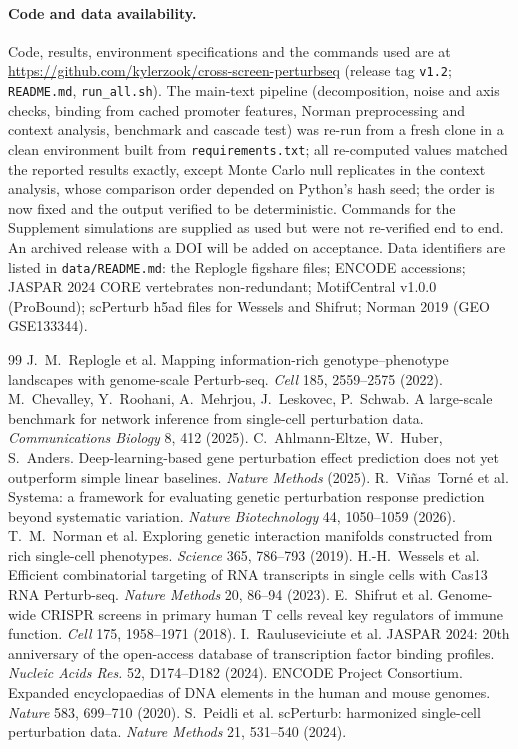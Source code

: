 \documentclass[10pt]{article}
\begin{document}
\paragraph{Code and data availability.} Code, results, environment specifications and the commands used are at \url{https://github.com/kylerzook/cross-screen-perturbseq} (release tag \texttt{v1.2}; \texttt{README.md}, \texttt{run\_all.sh}). The main-text pipeline (decomposition, noise and axis checks, binding from cached promoter features, Norman preprocessing and context analysis, benchmark and cascade test) was re-run from a fresh clone in a clean environment built from \texttt{requirements.txt}; all re-computed values matched the reported results exactly, except Monte Carlo null replicates in the context analysis, whose comparison order depended on Python's hash seed; the order is now fixed and the output verified to be deterministic. Commands for the Supplement simulations are supplied as used but were not re-verified end to end. An archived release with a DOI will be added on acceptance. Data identifiers are listed in \texttt{data/README.md}: the Replogle figshare files; ENCODE accessions; JASPAR 2024 CORE vertebrates non-redundant; MotifCentral v1.0.0 (ProBound); scPerturb h5ad files for Wessels and Shifrut; Norman 2019 (GEO GSE133344).

\begin{thebibliography}{99}\small
{} J.~M.~Replogle et al. Mapping information-rich genotype--phenotype landscapes with genome-scale Perturb-seq. \emph{Cell} 185, 2559--2575 (2022).
 M.~Chevalley, Y.~Roohani, A.~Mehrjou, J.~Leskovec, P.~Schwab. A large-scale benchmark for network inference from single-cell perturbation data. \emph{Communications Biology} 8, 412 (2025).
 C.~Ahlmann-Eltze, W.~Huber, S.~Anders. Deep-learning-based gene perturbation effect prediction does not yet outperform simple linear baselines. \emph{Nature Methods} (2025).
 R.~Vi\~nas~Torn\'e et al. Systema: a framework for evaluating genetic perturbation response prediction beyond systematic variation. \emph{Nature Biotechnology} 44, 1050--1059 (2026).
 T.~M.~Norman et al. Exploring genetic interaction manifolds constructed from rich single-cell phenotypes. \emph{Science} 365, 786--793 (2019).
 H.-H.~Wessels et al. Efficient combinatorial targeting of RNA transcripts in single cells with Cas13 RNA Perturb-seq. \emph{Nature Methods} 20, 86--94 (2023).
 E.~Shifrut et al. Genome-wide CRISPR screens in primary human T cells reveal key regulators of immune function. \emph{Cell} 175, 1958--1971 (2018).
 I.~Rauluseviciute et al. JASPAR 2024: 20th anniversary of the open-access database of transcription factor binding profiles. \emph{Nucleic Acids Res.} 52, D174--D182 (2024).
 ENCODE Project Consortium. Expanded encyclopaedias of DNA elements in the human and mouse genomes. \emph{Nature} 583, 699--710 (2020).
 S.~Peidli et al. scPerturb: harmonized single-cell perturbation data. \emph{Nature Methods} 21, 531--540 (2024).
\end{thebibliography}
\end{document}
